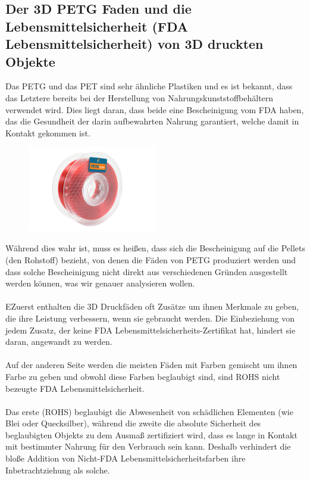 \documentclass[11pt,a4paper]{article}
\begin{document}
	\subsection{Der 3D PETG Faden und die Lebensmittelsicherheit (FDA Lebensmittelsicherheit) von 3D druckten Objekte}Das PETG und das PET sind sehr ähnliche Plastiken und es ist bekannt, dass das Letztere bereits bei der Herstellung von Nahrungskunststoffbehältern verwendet wird. Dies liegt daran, dass beide eine Bescheinigung vom FDA haben, das die Gesundheit der darin aufbewahrten Nahrung garantiert, welche damit in Kontakt gekommen ist. 
\begin{figure}[H]
\centering
\includegraphics[width=0.5\textwidth,cfbox=azul_marcos 1pt 0pt]{FOTOS/PETGKILOROJO}
\end{figure}
Während dies wahr ist, muss es heißen, dass sich die Bescheinigung auf die Pellets (den Rohstoff) bezieht, von denen die Fäden von PETG produziert werden und dass solche Bescheinigung nicht direkt aus verschiedenen Gründen ausgestellt werden können, was wir genauer analysieren wollen.
\\\\
EZuerst enthalten die 3D Druckfäden oft Zusätze um ihnen Merkmale zu geben, die ihre Leistung verbessern, wenn sie gebraucht werden. Die Einbeziehung von jedem Zusatz, der keine FDA Lebensmittelsicherheits-Zertifikat hat, hindert sie daran, angewandt zu werden.
\\\\
Auf der anderen Seite werden die meisten Fäden mit Farben gemischt um ihnen Farbe zu geben und obwohl diese Farben beglaubigt sind, sind ROHS nicht bezeugte FDA Lebensmittelsicherheit.
\\\\
Das erste (ROHS) beglaubigt die Abwesenheit von schädlichen Elementen (wie Blei oder Quecksilber), während die zweite die absolute Sicherheit des beglaubigten Objekts zu dem Ausmaß zertifiziert wird, dass es lange in Kontakt mit bestimmter Nahrung für den Verbrauch sein kann. Deshalb verhindert die bloße Addition von Nicht-FDA Lebensmittelsicherheitsfarben ihre Inbetrachtziehung als solche.
\end{document}
